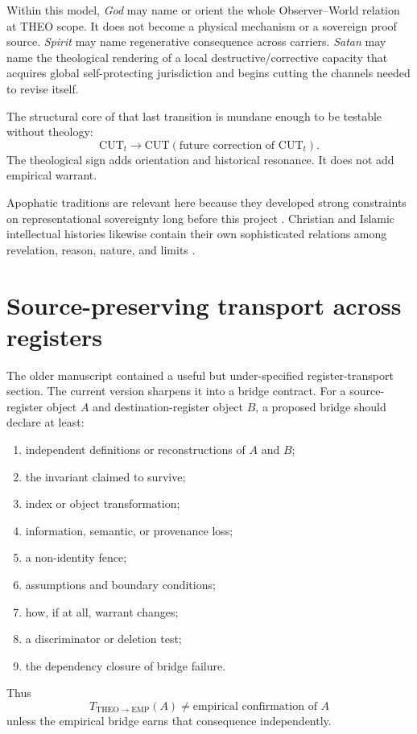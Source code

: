 \documentclass[11pt]{article}
\begin{document}
Within this model, \emph{God} may name or orient the whole Observer--World relation at THEO scope. It does not become a physical mechanism or a sovereign proof source. \emph{Spirit} may name regenerative consequence across carriers. \emph{Satan} may name the theological rendering of a local destructive/corrective capacity that acquires global self-protecting jurisdiction and begins cutting the channels needed to revise itself.

The structural core of that last transition is mundane enough to be testable without theology:
\begin{equation}
\mathrm{CUT}_t\rightarrow\mathrm{CUT}(\text{future correction of }\mathrm{CUT}_t).
\end{equation}
The theological sign adds orientation and historical resonance. It does not add empirical warrant.

Apophatic traditions are relevant here because they developed strong constraints on representational sovereignty long before this project \cite{SEPPseudoDionysius2019,SEPMysticism2025,SEPPhenomenologyReligion2024}. Christian and Islamic intellectual histories likewise contain their own sophisticated relations among revelation, reason, nature, and limits \cite{SEPChristianTheology2022,SEPArabicIslamicNatural2022,SEPIbnSinaNatural2025}.

\section{Source-preserving transport across registers}

The older manuscript contained a useful but under-specified register-transport section. The current version sharpens it into a bridge contract. For a source-register object $A$ and destination-register object $B$, a proposed bridge should declare at least:
\begin{enumerate}[label=(\roman*)]
\item independent definitions or reconstructions of $A$ and $B$;
\item the invariant claimed to survive;
\item index or object transformation;
\item information, semantic, or provenance loss;
\item a non-identity fence;
\item assumptions and boundary conditions;
\item how, if at all, warrant changes;
\item a discriminator or deletion test;
\item the dependency closure of bridge failure.
\end{enumerate}
Thus
\begin{equation}
T_{\mathrm{THEO}\rightarrow\mathrm{EMP}}(A)
\neq \text{empirical confirmation of }A
\end{equation}
unless the empirical bridge earns that consequence independently.
\end{document}
